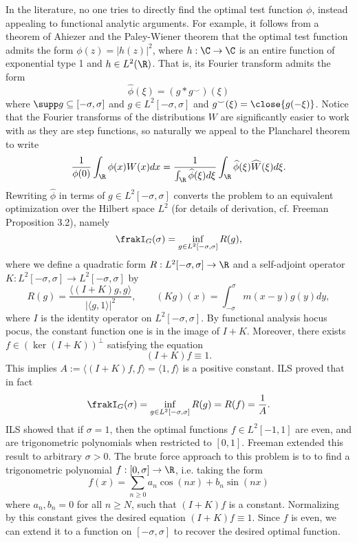 In the literature, no one tries to directly find the optimal test function $\phi$, instead appealing to functional analytic arguments. For example, it follows from a theorem of Ahiezer and the Paley-Wiener theorem that the optimal test function admits the form $\phi(z) = |h(z)|^2$, where $h : \C \to \C$ is an entire function of exponential type 1 and $h \in L^2 (\R)$. That is, its Fourier transform admits the form  
	\[ \widehat \phi (\xi) = (g * g^\smile) (\xi) \]
where $\supp g \subseteq [-\sigma, \sigma]$ and $g \in L^2 [-\sigma, \sigma]$ and $g^\smile (\xi) = \close{g(- \xi)}$. Notice that the Fourier transforms of the distributions $W$ are significantly easier to work with as they are step functions, so naturally we appeal to the Plancharel theorem to write
	\[\frac{1}{\phi(0)} \int_\R \phi(x) W (x) dx = \frac{1}{\int_\R \widehat \phi(\xi) d\xi} \int_\R \widehat \phi (\xi) \widehat W (\xi) d\xi . \]
Rewriting $\widehat \phi$ in terms of $g \in L^2 [-\sigma, \sigma]$ converts the problem to an equivalent optimization over the Hilbert space $L^2$ (for details of derivation, cf. Freeman Proposition 3.2), namely  
	\[ \frakI_G (\sigma) = \inf_{g \in L^2 [-\sigma, \sigma]} R(g), \]
where we define a quadratic form $R : L^2 [-\sigma, \sigma] \to \R$ and a self-adjoint operator $K: L^2 [-\sigma, \sigma] \to L^2 [-\sigma, \sigma]$ by 
	\[ R(g) = \frac{\langle (I + K)g,g \rangle}{| \langle g, 1 \rangle |^2}, \qquad (Kg) (x) = \int_{-\sigma}^\sigma m(x - y) g(y) dy, \]	
where $I$ is the identity operator on $L^2 [-\sigma, \sigma]$. By functional analysis hocus pocus, the constant function one is in the image of $I + K$. Moreover, there exists $f \in (\ker (I + K))^\perp$ satisfying the equation
	\[ (I + K) f \equiv 1. \]
This implies $A := \langle (I + K)f, f\rangle = \langle 1, f\rangle$ is a positive constant. ILS proved that in fact
	\[ \frakI_G (\sigma) = \inf_{g \in L^2 [-\sigma, \sigma]} R(g) = R(f) = \frac{1}{A}.  \]
ILS showed that if $\sigma = 1$, then the optimal functions $f \in L^2 [-1, 1]$ are even, and are trigonometric polynomials when restricted to $[0, 1]$. Freeman extended this result to arbitrary $\sigma > 0$. The brute force approach to this problem is to to find a trigonometric polynomial $f: [0, \sigma] \to \R$, i.e. taking the form
	\[ f(x) = \sum_{n \geq 0} a_n \cos(nx) + b_n \sin(nx) \]
where $a_n, b_n = 0$ for all $n \geq N$, such that $(I + K) f$ is a constant. Normalizing by this constant gives the desired equation $(I + K)f \equiv 1$. Since $f$ is even, we can extend it to a function on $[-\sigma, \sigma]$ to recover the desired optimal function. 
	
